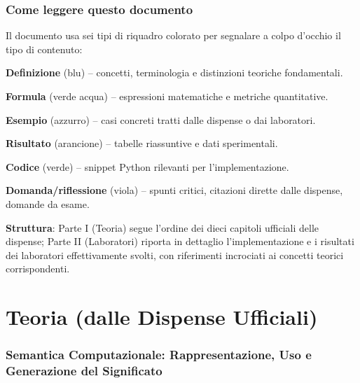\documentclass[12pt,a4paper]{article}
\begin{document}
\section*{Come leggere questo documento}

Il documento usa sei tipi di riquadro colorato per segnalare a colpo d'occhio il tipo di contenuto:

\begin{defbox}
\textbf{Definizione} (blu) -- concetti, terminologia e distinzioni teoriche fondamentali.
\end{defbox}
\begin{formulabox}
\textbf{Formula} (verde acqua) -- espressioni matematiche e metriche quantitative.
\end{formulabox}
\begin{examplebox}
\textbf{Esempio} (azzurro) -- casi concreti tratti dalle dispense o dai laboratori.
\end{examplebox}
\begin{resultbox}
\textbf{Risultato} (arancione) -- tabelle riassuntive e dati sperimentali.
\end{resultbox}
\begin{codebox}
\textbf{Codice} (verde) -- snippet Python rilevanti per l'implementazione.
\end{codebox}
\begin{quizbox}
\textbf{Domanda/riflessione} (viola) -- spunti critici, citazioni dirette dalle dispense, domande da esame.
\end{quizbox}

\textbf{Struttura}: Parte I (Teoria) segue l'ordine dei dieci capitoli ufficiali delle dispense; Parte II (Laboratori) riporta in dettaglio l'implementazione e i risultati dei laboratori effettivamente svolti, con riferimenti incrociati ai concetti teorici corrispondenti.

\newpage

\part{Teoria (dalle Dispense Ufficiali)}

\section{Semantica Computazionale: Rappresentazione, Uso e Generazione del Significato}
\end{document}
